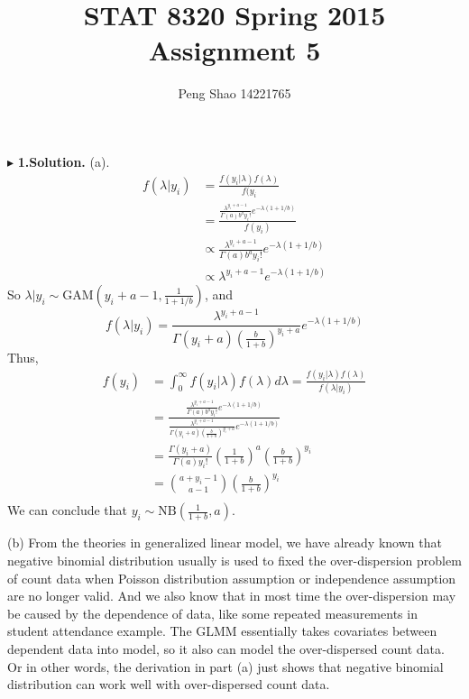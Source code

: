 \documentclass[letterpaper, 12pt]{article}
\newcommand{\ba}{$$\begin{aligned}}
\newcommand{\ea}{\end{aligned}$$}
\begin{document}
\title{STAT 8320 Spring 2015 Assignment 5}
\author{Peng Shao 14221765}
\maketitle
\indent




$\blacktriangleright$ \textbf{1.\quad Solution.} 
(a). 
\ba
f(\lambda|y_i)&=\frac{f(y_i|\lambda)f(\lambda)}{f(y_i}\\
&=\frac{\frac{\lambda^{y_i+a-1}}{\Gamma(a)b^ay_i!}e^{-\lambda(1+1/b)}}{f(y_i)}\\
&\propto \frac{\lambda^{y_i+a-1}}{\Gamma(a)b^ay_i!}e^{-\lambda(1+1/b)}\\
&\propto \lambda^{y_i+a-1}e^{-\lambda(1+1/b)}
\ea
So $\lambda|y_i\sim\text{GAM}(y_i+a-1,\frac{1}{1+1/b})$, and 
$$
f(\lambda|y_i)=\frac{\lambda^{y_i+a-1}}{\Gamma(y_i+a)\left(\frac{b}{1+b}\right)^{y_i+a}}e^{-\lambda(1+1/b)}
$$
Thus, 
\ba
f(y_i)&=\int_0^\infty f(y_i|\lambda)f(\lambda)d\lambda=\frac{f(y_i|\lambda)f(\lambda)}{f(\lambda|y_i)}\\
&=\frac{\frac{\lambda^{y_i+a-1}}{\Gamma(a)b^ay_i!}e^{-\lambda(1+1/b)}}{\frac{\lambda^{y_i+a-1}}{\Gamma(y_i+a)\left(\frac{b}{1+b}\right)^{y_i+a}}e^{-\lambda(1+1/b)}}\\
&=\frac{\Gamma(y_i+a)}{\Gamma(a)y_i!}\left(\frac{1}{1+b}\right)^a\left(\frac{b}{1+b}\right)^{y_i}\\
&=\binom{a+y_i-1}{a-1}\left(\frac{b}{1+b}\right)^{y_i}\\
\ea
We can conclude that $y_i\sim\text{NB}(\frac{1}{1+b},a)$.






(b) From the theories in generalized linear model, we have already known that negative binomial distribution usually is used to fixed the over-dispersion problem of count data when Poisson distribution assumption or independence assumption are no longer valid. And we also know that in most time the over-dispersion may be caused by the dependence of data, like some repeated measurements in student attendance example. The GLMM essentially takes covariates between dependent data into model, so it also can model the over-dispersed count data. Or in other words, the derivation in part (a) just shows that negative binomial distribution can work well with over-dispersed count data.
\end{document}
